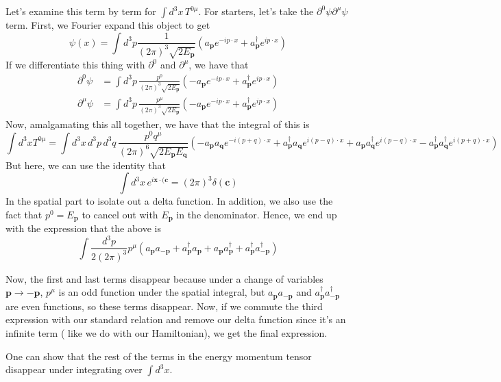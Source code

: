 \documentclass[11pt, oneside]{article}   	%
\theoremstyle{newline}
\theoremstyle{newline}
\theoremstyle{newline}
\theoremstyle{newline}
\theoremstyle{newline}
\begin{document}
Let's examine this term by term for $ \int d^3 x \, T^{ 0 \mu }$. For starters, let's take the $\partial^0 \psi \partial^\mu \psi $ term. First, we Fourier expand this object to get 
\[  
\psi( x) = \int d^3 p \frac{1}{(2 \pi )^3 \sqrt{ 2 E_\mathbf{p}} } \left( a_\mathbf{p} e^{ - i p \cdot x }  + a^\dagger_\mathbf{p} e^{ i p \cdot x } \right) \] 
If we differentiate this thing with $\partial^0$ and $\partial^\mu$, we have that 
\begin{align*} 
\partial^0 \psi & = \int d^3 p \,  \frac{p^0}{ (2 \pi )^3 \sqrt{ 2 E_\mathbf{p}} } \left(  - a_\mathbf{p} e^{ - i p \cdot x } + a_\mathbf{p}^\dagger e^{ i p \cdot x} \right) \\ 
\partial^\mu \psi & = \int d^3 p \, \frac{p^\mu}{ (2 \pi )^3 \sqrt{2 E_\mathbf{p}}} \left( - a_\mathbf{p} e^{ - i p \cdot x}  + a_\mathbf{p}^\dagger e^{ i p \cdot x } \right)  
\end{align*}    
Now, amalgamating this all together, we have that the integral of this is \[ \int d^3 x T^{ 0 \mu }  = \int d^3 x \, d^3 p \, d^3 q \, \frac{ p^0 q^\mu}{ ( 2 \pi )^6 \sqrt{ 2 E_\mathbf{p} E_\mathbf{q} }} \left( - a_\mathbf{p} a_\mathbf{q} e^{ - i ( p + q ) \cdot x } + a_\mathbf{p}^\dagger a_\mathbf{q} e^{ i ( p - q) \cdot x } + a_\mathbf{p} a_\mathbf{q}^\dagger e^{ i ( p -q ) \cdot x }  - a_\mathbf{p}^\dagger a_\mathbf{q}^\dagger e^{ i ( p + q ) \cdot x } \right) \] 
But here, we can use the identity that 
\[ 
\int d^3 x \, e^{i \mathbf{x} \cdot (\mathbf{c } }  = (2 \pi )^3 \delta ( \mathbf{ c} ) \] 
In the spatial part to isolate out a delta function. In addition, we also use the fact that $p^0 = E_\mathbf{p} $ to cancel out with $E_\mathbf{p}$ in the denominator. Hence, we end up with the expression that the above is 
\[ 
\int \frac{ d^3 p }{2 ( 2 \pi )^3 } p^\mu (a_\mathbf{p} a_\mathbf{ -p } + a_\mathbf{p}^\dagger a_\mathbf{p} + a_\mathbf{p} a_\mathbf{p}^\dagger + a_\mathbf{p}^\dagger a_{ \mathbf{ - p } }^\dagger ) \]  

Now, the first and last terms disappear because under a change of variables $\mathbf{p} \rightarrow \mathbf{ - p} $, $p^\mu$ is an odd function under the spatial integral, but $a_\mathbf{p} a_\mathbf{ -p} $ and $a_\mathbf{p}^\dagger a_\mathbf{-p}^\dagger$ are even functions, so these terms disappear. Now, if we commute the third expression with our standard relation and remove our delta function since it's an infinite term ( like we do with our Hamiltonian), we get the final expression. 

One can show that the rest of the terms in the energy momentum tensor disappear under integrating over $\int d^3 x $. 
\end{document}
